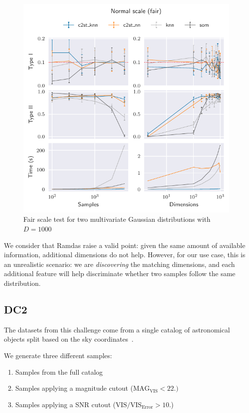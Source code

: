 \begin{figure}[htbp]
    \centering
    \includegraphics{images/6_som/normal_scale_fair}
    \caption{Fair scale test for two multivariate Gaussian distributions with $D=1000$}
    \label{fig:normal_fair_scale}
\end{figure}

We consider that Ramdas \etal raise a valid point: given the same amount of available
information, additional dimensions do not help. However, for our \PresQ use case, this is an
unrealistic scenario: we are \emph{discovering} the matching dimensions, and each additional
feature will help discriminate whether two samples follow the same distribution.

\subsection{DC2}
The datasets from this challenge come from a single catalog of astronomical
objects split based on the sky coordinates~\cite{EuclidDesprez2020}.

We generate three different samples:

\begin{enumerate}
    \item Samples from the full catalog
    \item Samples applying a magnitude cutout ($\text{MAG}_\text{VIS} < 22.)$
    \item Samples applying a \gls{SNR} cutout ($\text{VIS} / \text{VIS}_\text{Error} > 10.$)
\end{enumerate}

